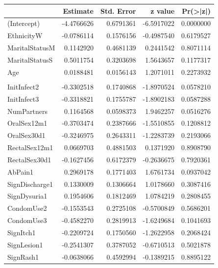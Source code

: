 \documentclass[
]{article}
\begin{document}
\begin{tabular}{l|r|r|r|r}
\hline
  & Estimate & Std. Error & z value & Pr(>|z|)\\
\hline
(Intercept) & -4.4766626 & 0.6791361 & -6.5917022 & 0.0000000\\
\hline
EthnicityW & -0.0786114 & 0.1576156 & -0.4987540 & 0.6179527\\
\hline
MaritalStatusM & 0.1142920 & 0.4681139 & 0.2441542 & 0.8071114\\
\hline
MaritalStatusS & 0.5011754 & 0.3203698 & 1.5643657 & 0.1177317\\
\hline
Age & 0.0188481 & 0.0156143 & 1.2071011 & 0.2273932\\
\hline
\cellcolor{blue}{\textcolor{white}{YearsSchool}} & \cellcolor{blue}{\textcolor{white}{-0.1689015}} & \cellcolor{blue}{\textcolor{white}{0.0442657}} & \cellcolor{blue}{\textcolor{white}{-3.8156308}} & \cellcolor{blue}{\textcolor{white}{0.0001358}}\\
\hline
InitInfect2 & -0.3302518 & 0.1740868 & -1.8970524 & 0.0578210\\
\hline
InitInfect3 & -0.3318821 & 0.1755787 & -1.8902183 & 0.0587288\\
\hline
NumPartners & 0.1164568 & 0.0598373 & 1.9462257 & 0.0516276\\
\hline
OralSex12m1 & -0.3703474 & 0.2387666 & -1.5510855 & 0.1208812\\
\hline
OralSex30d1 & -0.3246975 & 0.2643311 & -1.2283739 & 0.2193066\\
\hline
RectalSex12m1 & 0.0669703 & 0.4881503 & 0.1371920 & 0.8908790\\
\hline
RectalSex30d1 & -0.1627456 & 0.6172379 & -0.2636675 & 0.7920361\\
\hline
AbPain1 & 0.2969178 & 0.1771403 & 1.6761734 & 0.0937042\\
\hline
SignDischarge1 & 0.1330009 & 0.1306664 & 1.0178660 & 0.3087416\\
\hline
SignDysuria1 & 0.1954606 & 0.1812469 & 1.0784219 & 0.2808455\\
\hline
CondomUse2 & -0.1553543 & 0.2725108 & -0.5700849 & 0.5686201\\
\hline
CondomUse3 & -0.4582270 & 0.2819913 & -1.6249684 & 0.1041693\\
\hline
SignItch1 & -0.2209724 & 0.1750560 & -1.2622958 & 0.2068424\\
\hline
SignLesion1 & -0.2541307 & 0.3787052 & -0.6710513 & 0.5021878\\
\hline
SignRash1 & -0.0638066 & 0.4592994 & -0.1389215 & 0.8895122\\

\end{tabular}
\end{document}
